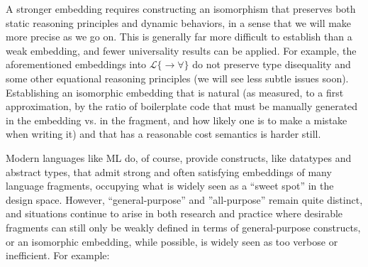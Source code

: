 \documentclass[9pt,preprint]{sigplanconf}
\begin{document}
%

A stronger embedding requires constructing an isomorphism that preserves both static reasoning principles and dynamic behaviors, in a sense that we will make more precise as we go on. This is generally far more difficult to establish than a weak embedding, and fewer universality results can be applied. For example, the aforementioned embeddings into $\mathcal{L}\{\rightarrow\forall\}$ do not preserve type disequality and some other equational reasoning principles (we will see less subtle issues soon). Establishing an isomorphic embedding that is natural (as measured, to a first approximation, by the ratio of boilerplate code that must be manually generated in the embedding vs. in the fragment, and how likely one is to make a mistake when writing it) and that has a reasonable cost semantics is harder still.

Modern languages like ML do, of course, provide constructs, like datatypes and abstract types, that admit strong and often satisfying embeddings of many language fragments, occupying what is widely seen as a ``sweet spot'' in the design space. However, ``general-purpose'' and ''all-purpose'' remain quite distinct, and situations continue to arise in both research and practice where desirable fragments can still only be weakly defined in terms of general-purpose constructs, or an isomorphic embedding, while possible, is widely seen as too verbose or inefficient. For example:
\end{document}
